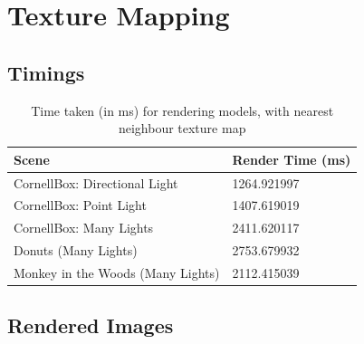 \documentclass[a4paper]{myarticle}
\begin{document}
\section{Texture Mapping}

\subsection{Timings}

\begin{table}[H]
\centering
\renewcommand{\arraystretch}{1.5}
\begin{tabularx}{\linewidth}{LL}
\hline
Scene & Render Time (ms) \\
\hline
CornellBox: Directional Light & 1264.921997 \\
CornellBox: Point Light & 1407.619019 \\
CornellBox: Many Lights & 2411.620117 \\
Donuts (Many Lights) & 2753.679932 \\
Monkey in the Woods (Many Lights) & 2112.415039 \\
\hline
\end{tabularx}
\caption{Time taken (in ms) for rendering models, with nearest neighbour texture map}
\end{table}

\subsection{Rendered Images}
\end{document}
